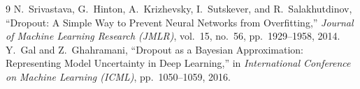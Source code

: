 \documentclass[11pt,a4paper]{article}
\theoremstyle{definition}
\begin{document}
\begin{thebibliography}{9}
 N.~Srivastava, G.~Hinton, A.~Krizhevsky, I.~Sutskever, and R.~Salakhutdinov, ``Dropout: A Simple Way to Prevent Neural Networks from Overfitting,'' \emph{Journal of Machine Learning Research (JMLR)}, vol.~15, no.~56, pp.~1929--1958, 2014.
 Y.~Gal and Z.~Ghahramani, ``Dropout as a Bayesian Approximation: Representing Model Uncertainty in Deep Learning,'' in \emph{International Conference on Machine Learning (ICML)}, pp.~1050--1059, 2016.
\end{thebibliography}
\end{document}
